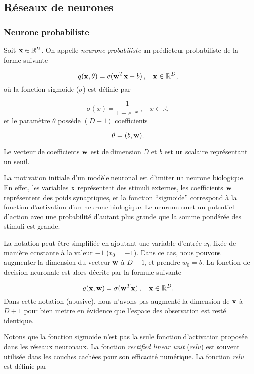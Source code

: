 \documentclass[]{article}
\begin{document}
\subsection{Réseaux de neurones}\label{reseaux-de-neurones}

\subsubsection{Neurone probabiliste}\label{neurone-probabiliste}

Soit \({\bf x} \in \mathbb{R}^D\). On appelle \emph{neurone
probabiliste} un prédicteur probabiliste de la forme suivante

\[
 q({\bf x}, \theta) =  \sigma( {\bf w}^T {\bf x}  - b ) \, , \quad  {\bf x} \in \mathbb{R}^D,
\] où la fonction sigmoide (\(\sigma\)) est définie par

\[
\sigma(x) = \frac{1}{1 + e^{-x}}\, , \quad  x \in \mathbb{R},
\] et le paramètre \(\theta\) possède \((D+1)\) coefficients

\[
\theta = (b, {\bf w}).
\]

Le vecteur de coefficients \({\bf w}\) est de dimension \(D\) et \(b\)
est un scalaire représentant un seuil.

La motivation initiale d'un modèle neuronal est d'imiter un neurone
biologique. En effet, les variables \({\bf x}\) représentent des stimuli
externes, les coefficients \({\bf w}\) représentent des poids
synaptiques, et la fonction ``sigmoide'' correspond à la fonction
d'activation d'un neurone biologique. Le neurone emet un potentiel
d'action avec une probabilité d'autant plus grande que la somme pondérée
des stimuli est grande.

La notation peut être simplifiée en ajoutant une variable d'entrée
\(x_{0}\) fixée de manière constante à la valeur \(-1\)
(\(x_{0} = -1\)). Dans ce cas, nous pouvons augmenter la dimension du
vecteur \({\bf w}\) à \(D+1\), et prendre \(w_0 = b\). La fonction de
decision neuronale est alors décrite par la formule suivante

\[
 q({\bf x}, {\bf w}) =  \sigma( {\bf w}^T {\bf x} ) \, , \quad  {\bf x} \in \mathbb{R}^D.
\] Dans cette notation (abusive), nous n'avons pas augmenté la dimension
de \({\bf x}\) à \(D+1\) pour bien mettre en évidence que l'espace des
observation est resté identique.

Notons que la fonction sigmoide n'est pas la seule fonction d'activation
proposée dans les réseaux neuronaux. La fonction \emph{rectified linear
unit} (\emph{relu}) est souvent utilisée dans les couches cachées pour
son efficacité numérique. La fonction \emph{relu} est définie par
\end{document}

